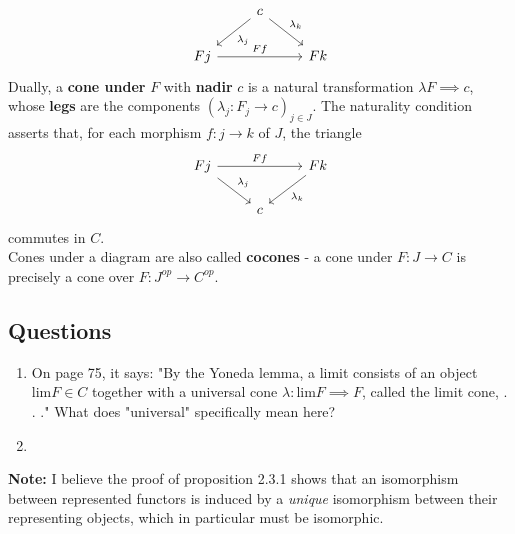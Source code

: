 \documentclass[a4paper]{article}
\begin{document}
\begin{equation*}
\begin{tikzcd}
    & c \arrow[dl, "\lambda_j"] \arrow[dr, "\lambda_k"] & \\
    Fj \arrow[rr, "Ff"] & & Fk 
\end{tikzcd}
\end{equation*}
Dually, a \textbf{cone under} $F$ with \textbf{nadir} $c$ is a natural
transformation $\lambda F \implies c$, whose \textbf{legs} are the components 
$\left( \lambda_j  \colon F_j \to c \right)_{j \in J}$. The naturality
condition asserts that, for each morphism $f  \colon j \to k$ of $J$, the
triangle
\begin{equation*}
\begin{tikzcd}
    Fj \arrow[rr, "Ff"] \arrow[dr, "\lambda_j"] & & Fk \arrow[dl,
    "\lambda_k"]\\
                                                & c &
\end{tikzcd}
\end{equation*}
commutes in $C$.\\
Cones under a diagram are also called \textbf{cocones} - a cone under
$F  \colon J \to C$ is precisely a cone over
$F  \colon J^{op} \to C^{op}$.



\subsection*{Questions}

\begin{enumerate}
    \item On page 75, it says: "By the Yoneda lemma, a limit consists of an
        object $\text{lim}F \in C$ together with a universal cone
        $\lambda  \colon \text{lim} F \implies F$, called the limit cone,
        . . ." What does "universal" specifically mean here?
    \item 
\end{enumerate}

\textbf{Note:} I believe the proof of proposition 2.3.1 shows that an
isomorphism between represented functors is induced by a \textit{unique}
isomorphism between their representing objects, which in particular must be
isomorphic.
\end{document}
